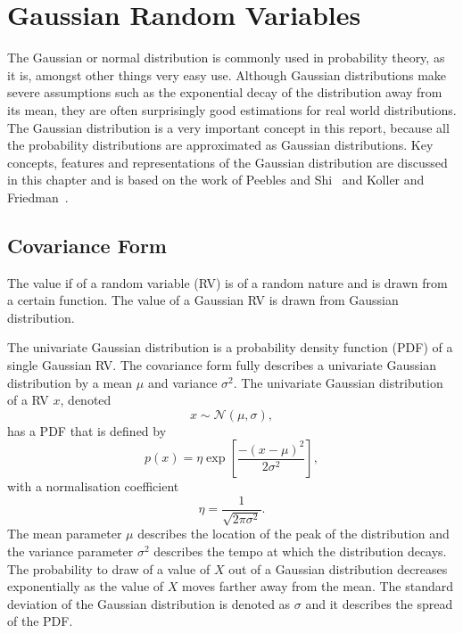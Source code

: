 \documentclass[12pt,oneside,openany,a4paper, %
afrikaans,english,
]{memoir}
\numberwithin{equation}{chapter}
\begin{document}
\chapter{Gaussian Random Variables}
The Gaussian or normal distribution is commonly used in probability theory, as it is, amongst other things very easy use. Although Gaussian distributions make severe assumptions such as the exponential decay of the distribution away from its mean, they are often surprisingly good estimations for real world distributions. The Gaussian distribution is a very important concept in this report, because all the probability distributions are approximated as Gaussian distributions. Key concepts, features and representations of the Gaussian distribution are discussed in this chapter and is based on the work of Peebles and Shi~\cite{peebles} and Koller and Friedman~\cite{koller}.

\section{Covariance Form}
The value if of a random variable (RV) is of a random nature and is drawn from a certain function. The value of a Gaussian RV is drawn from Gaussian distribution.

The univariate Gaussian distribution is a probability density function (PDF) of a single Gaussian RV. The covariance form fully describes a univariate Gaussian distribution by a mean $\mu$ and variance $\sigma^2$.
The univariate Gaussian distribution of a RV $x$, denoted
\begin{equation}
x\sim\mathcal{N}(\mu,\sigma),
\end{equation}
has a PDF that is defined by
\begin{equation}\label{eq:1}
p(x) = \eta\exp\left[\frac{-(x-\mu)^2}{2\sigma^2}\right],
\end{equation}
with a normalisation coefficient 
\begin{equation}\label{eq:2}
\eta = \frac{1}{\sqrt{2\pi\sigma^2}}.
\end{equation}
The mean parameter $\mu$ describes the location of the peak of the distribution and the variance parameter $\sigma^2$ describes the tempo at which the distribution decays. The probability to draw of a value of $X$ out of a Gaussian distribution decreases exponentially as the value of $X$ moves farther away from the mean. The standard deviation of the Gaussian distribution is denoted as $\sigma$ and it  describes the spread of the PDF.
\end{document}
